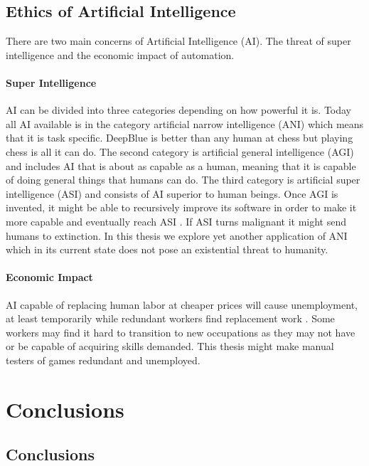 \documentclass{kththesis}
\begin{document}
\section{Ethics of Artificial Intelligence}
There are two main concerns of Artificial Intelligence (AI). The threat of super intelligence and the economic impact of automation.

\subsubsection{Super Intelligence}
AI can be  divided into three categories  depending on how powerful it is. Today all AI available is in the category artificial narrow intelligence (ANI) which means that it is task specific. DeepBlue is better than any human at chess but playing chess is all it can do. The second category is artificial general intelligence (AGI) and  includes AI that is about as capable as a human, meaning that it is capable of doing general things that humans can do. The third category is  artificial super intelligence (ASI) and  consists of AI superior to human beings. Once AGI is invented, it might be able to recursively improve its software in order to make it more capable and eventually reach ASI \cite{bostrom1998long}. If ASI turns malignant it might send humans to extinction. In this thesis we explore yet another application of ANI which in its current state does not pose an existential threat to humanity.

\subsubsection{Economic Impact}
AI capable of replacing human labor  at cheaper prices will cause unemployment, at least temporarily while redundant workers  find replacement work \cite{nilsson1984artificial}. Some workers may find it hard to transition to new occupations as they may not have or be capable of acquiring skills demanded. This thesis might make  manual testers of games redundant and unemployed.

\chapter{Conclusions}
\section{Conclusions}
\end{document}
